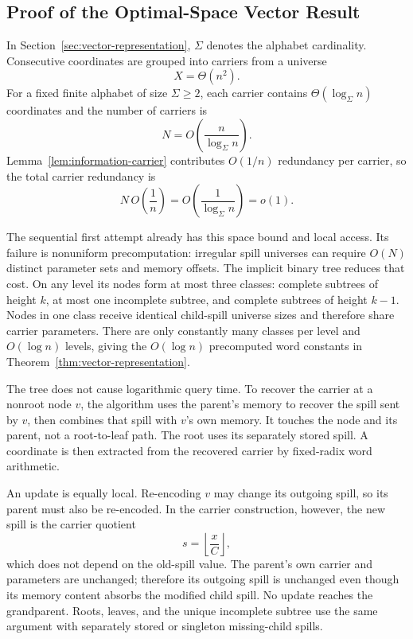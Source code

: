 \subsection{Proof of the Optimal-Space Vector Result}

In Section~\ref{sec:vector-representation}, \(\Sigma\) denotes the alphabet
cardinality.  Consecutive coordinates are grouped into carriers from a
universe
\[
    X=\Theta(n^2).
\]
For a fixed finite alphabet of size \(\Sigma\geq2\), each carrier contains
\(\Theta(\log_{\Sigma}n)\) coordinates and the number of carriers is
\[
    N=O\left(\frac{n}{\log_{\Sigma}n}\right).
\]
Lemma~\ref{lem:information-carrier} contributes \(O(1/n)\) redundancy per
carrier, so the total carrier redundancy is
\[
    N\,O\left(\frac{1}{n}\right)
    =O\left(\frac{1}{\log_{\Sigma}n}\right)
    =o(1).
\]

The sequential first attempt already has this space bound and local access.
Its failure is nonuniform precomputation: irregular spill universes can
require \(O(N)\) distinct parameter sets and memory offsets.  The implicit
binary tree reduces that cost.  On any level its nodes form at most three
classes: complete subtrees of height \(k\), at most one incomplete subtree,
and complete subtrees of height \(k-1\).  Nodes in one class receive identical
child-spill universe sizes and therefore share carrier parameters.  There are
only constantly many classes per level and \(O(\log n)\) levels, giving the
\(O(\log n)\) precomputed word constants in
Theorem~\ref{thm:vector-representation}.

The tree does not cause logarithmic query time.  To recover the carrier at a
nonroot node \(v\), the algorithm uses the parent's memory to recover the
spill sent by \(v\), then combines that spill with \(v\)'s own memory.  It
touches the node and its parent, not a root-to-leaf path.  The root uses its
separately stored spill.  A coordinate is then extracted from the recovered
carrier by fixed-radix word arithmetic.

An update is equally local.  Re-encoding \(v\) may change its outgoing spill,
so its parent must also be re-encoded.  In the carrier construction, however,
the new spill is the carrier quotient
\[
    s=\left\lfloor\frac{x}{C}\right\rfloor,
\]
which does not depend on the old-spill value.  The parent's own carrier and
parameters are unchanged; therefore its outgoing spill is unchanged even
though its memory content absorbs the modified child spill.  No update reaches
the grandparent.  Roots, leaves, and the unique incomplete subtree use the
same argument with separately stored or singleton missing-child spills.

